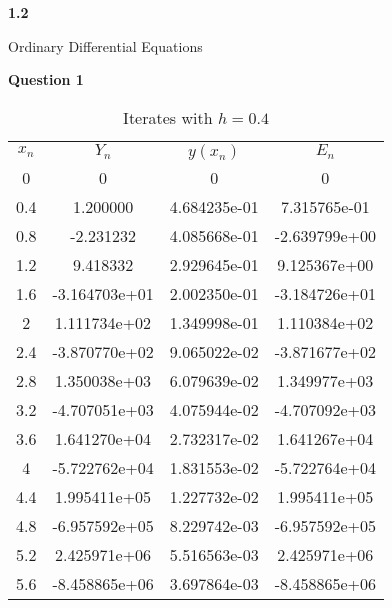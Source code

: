 \documentclass[14pt]{extarticle}
\begin{document}
\begin{flushleft}
\begin{LARGE}
\textbf{1.2}
\end{LARGE}
\end{flushleft}

\vfill
\begin{center}
\begin{Huge}Ordinary Differential Equations\end{Huge}
\end{center}
\vfill

\pagebreak

\begin{center}
\textbf{Question 1}
\end{center}

\begin{table}[h!]
\caption{Iterates with $h=0.4$}
\centering
\begin{tabular}{cccc}
\\
$x_n$ & $Y_n$ & $y(x_n)$ & $E_n$ \\ [0.5ex]
  0  &    0            &    0            &    0            \\ 
0.4  &    1.200000     &    4.684235e-01 &    7.315765e-01 \\ 
0.8  &   -2.231232     &    4.085668e-01 &   -2.639799e+00 \\ 
1.2  &    9.418332     &    2.929645e-01 &    9.125367e+00 \\ 
1.6  &   -3.164703e+01 &    2.002350e-01 &   -3.184726e+01 \\ 
  2  &    1.111734e+02 &    1.349998e-01 &    1.110384e+02 \\ 
2.4  &   -3.870770e+02 &    9.065022e-02 &   -3.871677e+02 \\ 
2.8  &    1.350038e+03 &    6.079639e-02 &    1.349977e+03 \\ 
3.2  &   -4.707051e+03 &    4.075944e-02 &   -4.707092e+03 \\ 
3.6  &    1.641270e+04 &    2.732317e-02 &    1.641267e+04 \\ 
  4  &   -5.722762e+04 &    1.831553e-02 &   -5.722764e+04 \\ 
4.4  &    1.995411e+05 &    1.227732e-02 &    1.995411e+05 \\ 
4.8  &   -6.957592e+05 &    8.229742e-03 &   -6.957592e+05 \\ 
5.2  &    2.425971e+06 &    5.516563e-03 &    2.425971e+06 \\ 
5.6  &   -8.458865e+06 &    3.697864e-03 &   -8.458865e+06 \\ 

\end{tabular}
\end{table}
\end{document}
